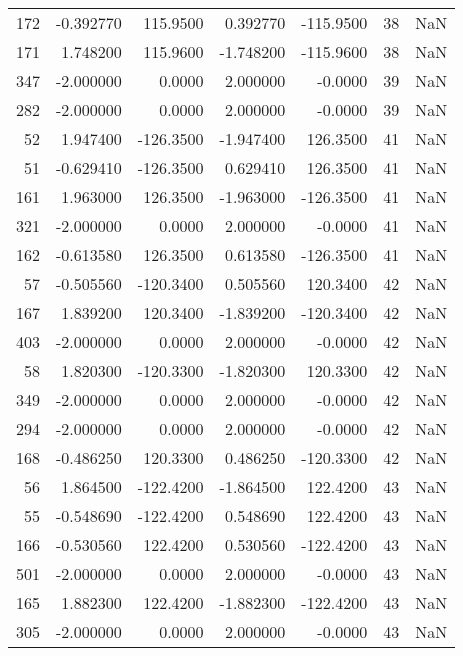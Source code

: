 \begin{tabular}{rrrrrrr}
172 &   -0.392770 &  115.9500 &    0.392770 &   -115.9500 &          38 & NaN \\
171 &    1.748200 &  115.9600 &   -1.748200 &   -115.9600 &          38 & NaN \\
347 &   -2.000000 &    0.0000 &    2.000000 &     -0.0000 &          39 & NaN \\
282 &   -2.000000 &    0.0000 &    2.000000 &     -0.0000 &          39 & NaN \\
 52 &    1.947400 & -126.3500 &   -1.947400 &    126.3500 &          41 & NaN \\
 51 &   -0.629410 & -126.3500 &    0.629410 &    126.3500 &          41 & NaN \\
161 &    1.963000 &  126.3500 &   -1.963000 &   -126.3500 &          41 & NaN \\
321 &   -2.000000 &    0.0000 &    2.000000 &     -0.0000 &          41 & NaN \\
162 &   -0.613580 &  126.3500 &    0.613580 &   -126.3500 &          41 & NaN \\
 57 &   -0.505560 & -120.3400 &    0.505560 &    120.3400 &          42 & NaN \\
167 &    1.839200 &  120.3400 &   -1.839200 &   -120.3400 &          42 & NaN \\
403 &   -2.000000 &    0.0000 &    2.000000 &     -0.0000 &          42 & NaN \\
 58 &    1.820300 & -120.3300 &   -1.820300 &    120.3300 &          42 & NaN \\
349 &   -2.000000 &    0.0000 &    2.000000 &     -0.0000 &          42 & NaN \\
294 &   -2.000000 &    0.0000 &    2.000000 &     -0.0000 &          42 & NaN \\
168 &   -0.486250 &  120.3300 &    0.486250 &   -120.3300 &          42 & NaN \\
 56 &    1.864500 & -122.4200 &   -1.864500 &    122.4200 &          43 & NaN \\
 55 &   -0.548690 & -122.4200 &    0.548690 &    122.4200 &          43 & NaN \\
166 &   -0.530560 &  122.4200 &    0.530560 &   -122.4200 &          43 & NaN \\
501 &   -2.000000 &    0.0000 &    2.000000 &     -0.0000 &          43 & NaN \\
165 &    1.882300 &  122.4200 &   -1.882300 &   -122.4200 &          43 & NaN \\
305 &   -2.000000 &    0.0000 &    2.000000 &     -0.0000 &          43 & NaN \\

\end{tabular}
